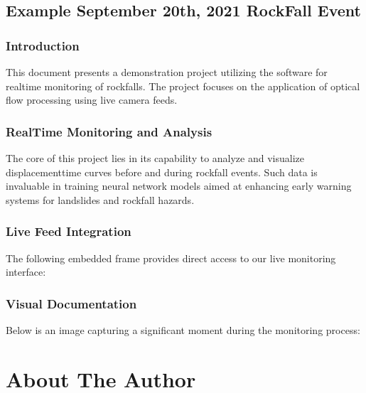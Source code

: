 \documentclass[letterpaper,10pt,english]{sphinxmanual}
\let\sphinxpxdimen\pdfpxdimen\else\newdimen\sphinxpxdimen
\begin{document}
\section{Example September 20th, 2021 RockFall Event}
\label{\detokenize{Stawamus_Chief:example-september-20th-2021-rockfall-event}}

\subsection{Introduction}
\label{\detokenize{Stawamus_Chief:introduction}}
\sphinxAtStartPar
This document presents a demonstration project utilizing the  software for real\sphinxhyphen{}time monitoring of rockfalls. The project focuses on the application of optical flow processing using live camera feeds.


\subsection{Real\sphinxhyphen{}Time Monitoring and Analysis}
\label{\detokenize{Stawamus_Chief:real-time-monitoring-and-analysis}}
\sphinxAtStartPar
The core of this project lies in its capability to analyze and visualize displacement\sphinxhyphen{}time curves before and during rockfall events. Such data is invaluable in training neural network models aimed at enhancing early warning systems for landslides and rockfall hazards.


\subsection{Live Feed Integration}
\label{\detokenize{Stawamus_Chief:live-feed-integration}}
\sphinxAtStartPar
The following embedded frame provides direct access to our live monitoring interface:




\subsection{Visual Documentation}
\label{\detokenize{Stawamus_Chief:visual-documentation}}
\sphinxAtStartPar
Below is an image capturing a significant moment during the monitoring process:

\sphinxAtStartPar
\sphinxincludegraphics[width=1000\sphinxpxdimen,height=882\sphinxpxdimen]{{shot_squamish}.png}

\sphinxstepscope


\chapter{About The Author}
\label{\detokenize{aboutMe:about-the-author}}\label{\detokenize{aboutMe::doc}}
\end{document}
